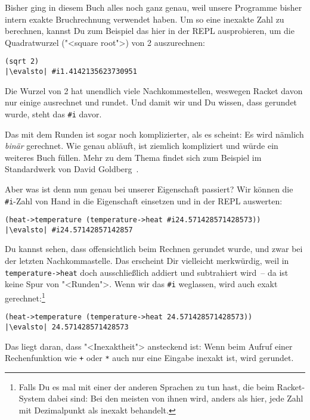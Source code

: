 Bisher ging in diesem Buch alles noch ganz genau, weil unsere
Programme bisher intern exakte Bruchrechnung verwendet haben.  Um so
eine inexakte Zahl zu berechnen, kannst Du zum Beispiel das hier in
der REPL ausprobieren, um die Quadratwurzel ("<square root">) von 2
auszurechnen:
%
\begin{lstlisting}
(sqrt 2)
|\evalsto| #i1.4142135623730951
\end{lstlisting}
%
Die Wurzel von 2 hat unendlich viele Nachkommestellen, weswegen Racket
davon nur einige ausrechnet und rundet.  Und damit wir und Du wissen,
dass gerundet wurde, steht das \lstinline{#i} davor.

Das mit dem Runden ist sogar noch komplizierter, als es scheint: Es
wird nämlich \emph{binär} gerechnet.  Wie genau abläuft, ist ziemlich
kompliziert und würde ein weiteres Buch füllen.  Mehr zu dem Thema
findet sich zum Beispiel im Standardwerk von David
Goldberg~\cite{Goldberg1991}.

Aber was ist denn nun genau bei unserer Eigenschaft passiert?  Wir
können die \lstinline{#i}-Zahl von Hand in die Eigenschaft einsetzen
und in der REPL auswerten:
%
\begin{lstlisting}
(heat->temperature (temperature->heat #i24.571428571428573))
|\evalsto| #i24.57142857142857
\end{lstlisting}
%
Du kannst sehen, dass offensichtlich beim Rechnen gerundet wurde, und
zwar bei der letzten Nachkommastelle.  Das erscheint Dir vielleicht
merkwürdig, weil in 
\lstinline{temperature->heat} doch ausschließlich addiert und
subtrahiert wird~-- da ist keine Spur von "<Runden">.  Wenn wir das
\lstinline{#i} weglassen, wird auch exakt gerechnet:\footnote{Falls Du
  es mal mit einer der anderen Sprachen zu tun hast, die beim
  Racket-System dabei sind: Bei den meisten von ihnen wird, anders als
  hier, jede Zahl mit Dezimalpunkt als inexakt behandelt.}
%
\begin{lstlisting}
(heat->temperature (temperature->heat 24.571428571428573))
|\evalsto| 24.571428571428573
\end{lstlisting}
%
Das liegt daran, dass "<Inexaktheit"> ansteckend ist: Wenn beim Aufruf
einer Rechenfunktion wie \lstinline{+} oder \lstinline{*} auch nur
eine Eingabe inexakt ist, wird gerundet.

